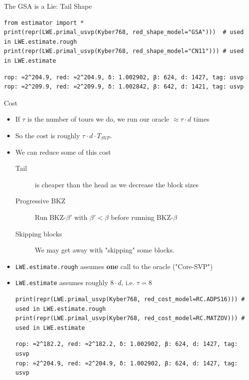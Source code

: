 \documentclass[table,10pt,aspectratio=169]{beamer}
\begin{document}
\begin{frame}[label={sec:org737931d},fragile]{The GSA is a Lie: Tail Shape}
 \lstset{language=Python,label= ,caption= ,captionpos=b,numbers=none}
\begin{lstlisting}
from estimator import *
print(repr(LWE.primal_usvp(Kyber768, red_shape_model="GSA")))  # used in LWE.estimate.rough
print(repr(LWE.primal_usvp(Kyber768, red_shape_model="CN11"))) # used in LWE.estimate
\end{lstlisting}

\begin{verbatim}
rop: ≈2^204.9, red: ≈2^204.9, δ: 1.002902, β: 624, d: 1427, tag: usvp
rop: ≈2^209.9, red: ≈2^209.9, δ: 1.002842, β: 642, d: 1421, tag: usvp
\end{verbatim}
\end{frame}

\begin{frame}[label={sec:org2ba7c91},fragile]{Cost}
 \begin{itemize}
\item If \(\tau\)  is the number of tours we do, we run our oracle \(\approx \tau \cdot d\) times
\item So the cost is roughly \(\tau \cdot d \cdot T_{SVP}\).
\item We can reduce some of this cost
\begin{description}
\item[{Tail}] is cheaper than the head as we decrease the block sizes
\item[{Progressive BKZ}] Run BKZ-\(\beta'\) with \(\beta' < \beta\) before running BKZ-\(\beta\)
\item[{Skipping blocks}] We may get away with "skipping" some blocks.
\end{description}
\item \texttt{LWE.estimate.rough} assumes \textbf{one} call to the oracle ("Core-SVP")
\item \texttt{LWE.estimate} assumes roughly \(8 \cdot d\), i.e. \(\tau = 8\)

\lstset{language=Python,label= ,caption= ,captionpos=b,numbers=none}
\begin{lstlisting}
print(repr(LWE.primal_usvp(Kyber768, red_cost_model=RC.ADPS16))) # used in LWE.estimate.rough
print(repr(LWE.primal_usvp(Kyber768, red_cost_model=RC.MATZOV))) # used in LWE.estimate
\end{lstlisting}

\begin{verbatim}
rop: ≈2^182.2, red: ≈2^182.2, δ: 1.002902, β: 624, d: 1427, tag: usvp
rop: ≈2^204.9, red: ≈2^204.9, δ: 1.002902, β: 624, d: 1427, tag: usvp
\end{verbatim}
\end{itemize}
\end{frame}
\end{document}
